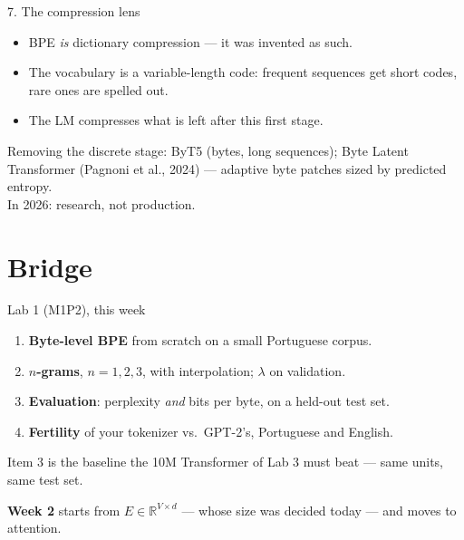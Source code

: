 \documentclass[11pt,aspectratio=169]{beamer}
\begin{document}
\begin{frame}{7. The compression lens}
  \begin{itemize}
    \item BPE \emph{is} dictionary compression --- it was invented as such.
    \item The vocabulary is a variable-length code: frequent sequences get short codes, rare
          ones are spelled out.
    \item The LM compresses what is left after this first stage.
  \end{itemize}

  \vspace{1em}
  Removing the discrete stage: ByT5 (bytes, long sequences); Byte Latent Transformer
  (Pagnoni et al., 2024) --- adaptive byte patches sized by predicted entropy.\\
  In 2026: research, not production.
\end{frame}

\section{Bridge}

\begin{frame}{Lab 1 (M1P2), this week}
  \begin{enumerate}
    \item \textbf{Byte-level BPE} from scratch on a small Portuguese corpus.
    \item \textbf{$n$-grams}, $n = 1, 2, 3$, with interpolation; $\lambda$ on validation.
    \item \textbf{Evaluation}: perplexity \emph{and} bits per byte, on a held-out test set.
    \item \textbf{Fertility} of your tokenizer vs.\ GPT-2's, Portuguese and English.
  \end{enumerate}

  \vspace{1em}
  \begin{block}{}
    Item 3 is the baseline the 10M Transformer of Lab 3 must beat --- same units, same
    test set.
  \end{block}

  \vspace{0.8em}
  \textbf{Week 2} starts from $E\in\mathbb{R}^{V\times d}$ --- whose size was decided today
  --- and moves to attention.
\end{frame}
\end{document}
